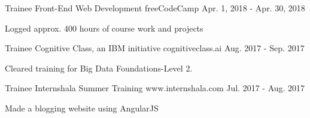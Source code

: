 


\begin{cventries}


\cventry
{Trainee} %
{Front-End Web Development} %
{freeCodeCamp} %
{Apr. 1, 2018 - Apr. 30, 2018} %
{ %
\begin{cvitems}
\item {Logged approx. 400 hours of course work and projects}
\end{cvitems}
}


\cventry
{Trainee} %
{Cognitive Class, an IBM initiative} %
{cognitiveclass.ai} %
{Aug. 2017 - Sep. 2017} %
{ %
\begin{cvitems}
\item {Cleared training for Big Data Foundations-Level 2.}
\end{cvitems}
}


\cventry
{Trainee} %
{Internshala Summer Training} %
{www.internshala.com} %
{Jul. 2017 - Aug. 2017} %
{ %
\begin{cvitems}
\item {Made a blogging website using AngularJS}
\end{cvitems}
}


\end{cventries}